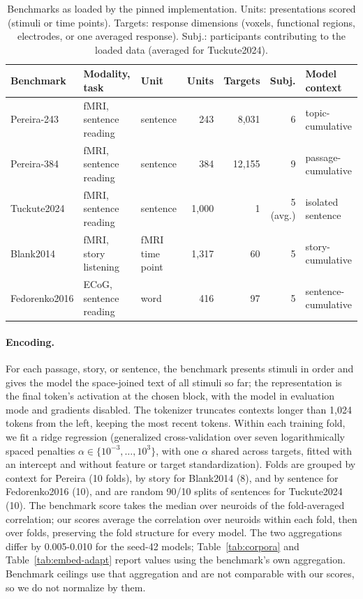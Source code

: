 \documentclass[mlmain]{jmlr}
\begin{document}
\begin{table}[htbp]
  \centering
  \caption{Benchmarks as loaded by the pinned implementation. Units: presentations scored (stimuli or time points). Targets: response dimensions (voxels, functional regions, electrodes, or one averaged response). Subj.: participants contributing to the loaded data (averaged for Tuckute2024).}
  \label{tab:benchmark-table}
  \scriptsize
  \setlength{\tabcolsep}{3.5pt}
  \begin{tabular}{lllrrrl}
\toprule
Benchmark & Modality, task & Unit & Units & Targets & Subj. & Model context \\
\midrule
Pereira-243 & fMRI, sentence reading & sentence & 243 & 8{,}031 & 6 & topic-cumulative \\
Pereira-384 & fMRI, sentence reading & sentence & 384 & 12{,}155 & 9 & passage-cumulative \\
Tuckute2024 & fMRI, sentence reading & sentence & 1{,}000 & 1 & 5 (avg.) & isolated sentence \\
Blank2014 & fMRI, story listening & fMRI time point & 1{,}317 & 60 & 5 & story-cumulative \\
Fedorenko2016 & ECoG, sentence reading & word & 416 & 97 & 5 & sentence-cumulative \\
\bottomrule
\end{tabular}
\end{table}

\paragraph{Encoding.} For each passage, story, or sentence, the benchmark presents stimuli in order and gives the model the space-joined text of all stimuli so far; the representation is the final token's activation at the chosen block, with the model in evaluation mode and gradients disabled. The tokenizer truncates contexts longer than 1,024 tokens from the left, keeping the most recent tokens. Within each training fold, we fit a ridge regression (generalized cross-validation over seven logarithmically spaced penalties $\alpha \in \{10^{-3}, \ldots, 10^{3}\}$, with one $\alpha$ shared across targets, fitted with an intercept and without feature or target standardization). Folds are grouped by context for Pereira (10 folds), by story for Blank2014 (8), and by sentence for Fedorenko2016 (10), and are random 90/10 splits of sentences for Tuckute2024 (10). The benchmark score takes the median over neuroids of the fold-averaged correlation; our scores average the correlation over neuroids within each fold, then over folds, preserving the fold structure for every model. The two aggregations differ by 0.005-0.010 for the seed-42 models; Table~\ref{tab:corpora} and Table~\ref{tab:embed-adapt} report values using the benchmark's own aggregation. Benchmark ceilings use that aggregation and are not comparable with our scores, so we do not normalize by them.
\end{document}
